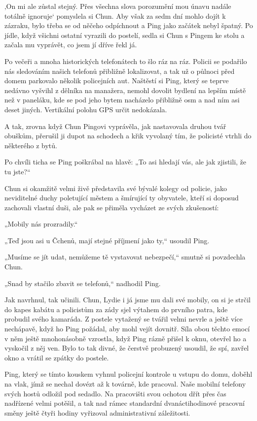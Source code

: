 ‚On mi ale zůstal stejný. Přes všechna slova porozumění mou únavu nadále totálně ignoruje‘ pomyslela si Chun. Aby však za sedm dní mohlo dojít k zázraku, bylo třeba se od něčeho odpíchnout a Ping jako začátek nebyl špatný.
Po jídle, když všichni ostatní vyrazili do postelí, sedla si Chun s Pingem ke stolu a začala mu vyprávět, co jsem jí dříve řekl já.

Po večeři a mnoha historických telefonátech to šlo ráz na ráz. Policii se podařilo nás sledováním našich telefonů přibližně lokalizovat, a tak už o půlnoci před domem parkovalo několik policejních aut. Naštěstí si Ping, který se teprve nedávno vyšvihl z dělníka na manažera, nemohl dovolit bydlení na lepším místě než v paneláku, kde se pod jeho bytem nacházelo přibližně osm a nad ním asi deset jiných. Vertikální polohu GPS určit nedokázala. 

A tak, zrovna když Chun Pingovi vyprávěla, jak nastavovala druhou tvář obuškům, přerušil ji dupot na schodech a křik vyvolaný tím, že policisté vtrhli do některého z bytů.

Po chvíli ticha se Ping poškrábal na hlavě: „To asi hledají vás, ale jak zjistili, že tu jste?“

Chun si okamžitě velmi živě představila své bývalé kolegy od policie, jako neviditelné duchy poletující městem a šmírující ty obyvatele, kteří si doposud zachovali vlastní duši, ale pak se přiměla vycházet ze svých zkušeností: 

„Mobily nás prozradily.“

„Teď jsou asi u Čchenů, mají stejné příjmení jako ty,“ usoudil Ping.

„Musíme se jít udat, nemůžeme tě vystavovat nebezpečí,“ smutně si povzdechla Chun.

„Snad by stačilo zbavit se telefonů,“ nadhodil Ping.

Jak navrhnul, tak učinili. Chun, Lydie i já jsme mu dali své mobily, on si je strčil do kapes kabátu a policistům za zády sjel výtahem do prvního patra, kde probudil svého kamaráda. Z postele vytažený se tvářil velmi nevrle a ještě více nechápavě, když ho Ping požádal, aby mohl vejít dovnitř. Síla obou těchto emocí v něm ještě mnohonásobně vzrostla, když Ping rázně přišel k oknu, otevřel ho a vyskočil z něj ven. Bylo to tak divné, že čerstvě probuzený usoudil, že spí, zavřel okno a vrátil se zpátky do postele.

Ping, který se tímto kouskem vyhnul policejní kontrole u vstupu do domu, doběhl na vlak, jímž se nechal dovézt až k továrně, kde pracoval. Naše mobilní telefony svých hostů odložil pod sedadlo. Na pracovišti svou ochotou dřít přes čas nadřízené velmi potěšil, a tak nad rámec standardní dvanáctihodinové pracovní směny ještě čtyři hodiny vyřizoval administrativní záležitosti.
\vspace{0.75cm}

